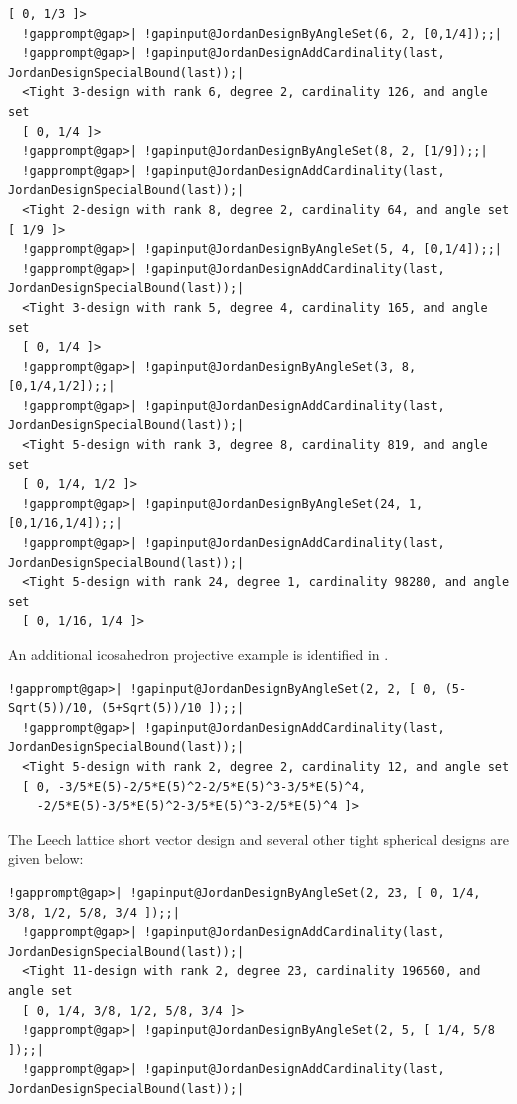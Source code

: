 \documentclass[a4paper,11pt]{report}
\begin{document}
{{\begin{Verbatim}[commandchars=!@|,fontsize=\small,frame=single,label=Example]
  [ 0, 1/3 ]>
  !gapprompt@gap>| !gapinput@JordanDesignByAngleSet(6, 2, [0,1/4]);;|
  !gapprompt@gap>| !gapinput@JordanDesignAddCardinality(last, JordanDesignSpecialBound(last));|
  <Tight 3-design with rank 6, degree 2, cardinality 126, and angle set
  [ 0, 1/4 ]>
  !gapprompt@gap>| !gapinput@JordanDesignByAngleSet(8, 2, [1/9]);;|
  !gapprompt@gap>| !gapinput@JordanDesignAddCardinality(last, JordanDesignSpecialBound(last));|
  <Tight 2-design with rank 8, degree 2, cardinality 64, and angle set [ 1/9 ]>
  !gapprompt@gap>| !gapinput@JordanDesignByAngleSet(5, 4, [0,1/4]);;|
  !gapprompt@gap>| !gapinput@JordanDesignAddCardinality(last, JordanDesignSpecialBound(last));|
  <Tight 3-design with rank 5, degree 4, cardinality 165, and angle set
  [ 0, 1/4 ]>
  !gapprompt@gap>| !gapinput@JordanDesignByAngleSet(3, 8, [0,1/4,1/2]);;|
  !gapprompt@gap>| !gapinput@JordanDesignAddCardinality(last, JordanDesignSpecialBound(last));|
  <Tight 5-design with rank 3, degree 8, cardinality 819, and angle set
  [ 0, 1/4, 1/2 ]>
  !gapprompt@gap>| !gapinput@JordanDesignByAngleSet(24, 1, [0,1/16,1/4]);;|
  !gapprompt@gap>| !gapinput@JordanDesignAddCardinality(last, JordanDesignSpecialBound(last));|
  <Tight 5-design with rank 24, degree 1, cardinality 98280, and angle set
  [ 0, 1/16, 1/4 ]>
\end{Verbatim}
 An additional icosahedron projective example is identified in \cite{lyubich_tight_2009}. 
\begin{Verbatim}[commandchars=!@|,fontsize=\small,frame=single,label=Example]
  !gapprompt@gap>| !gapinput@JordanDesignByAngleSet(2, 2, [ 0, (5-Sqrt(5))/10, (5+Sqrt(5))/10 ]);;|
  !gapprompt@gap>| !gapinput@JordanDesignAddCardinality(last, JordanDesignSpecialBound(last));|
  <Tight 5-design with rank 2, degree 2, cardinality 12, and angle set
  [ 0, -3/5*E(5)-2/5*E(5)^2-2/5*E(5)^3-3/5*E(5)^4,
    -2/5*E(5)-3/5*E(5)^2-3/5*E(5)^3-2/5*E(5)^4 ]>
\end{Verbatim}
 The Leech lattice short vector design and several other tight spherical
designs are given below: 
\begin{Verbatim}[commandchars=!@|,fontsize=\small,frame=single,label=Example]
  !gapprompt@gap>| !gapinput@JordanDesignByAngleSet(2, 23, [ 0, 1/4, 3/8, 1/2, 5/8, 3/4 ]);;|
  !gapprompt@gap>| !gapinput@JordanDesignAddCardinality(last, JordanDesignSpecialBound(last));|
  <Tight 11-design with rank 2, degree 23, cardinality 196560, and angle set
  [ 0, 1/4, 3/8, 1/2, 5/8, 3/4 ]>
  !gapprompt@gap>| !gapinput@JordanDesignByAngleSet(2, 5, [ 1/4, 5/8 ]);;|
  !gapprompt@gap>| !gapinput@JordanDesignAddCardinality(last, JordanDesignSpecialBound(last));|

\end{Verbatim}}}
\end{document}
